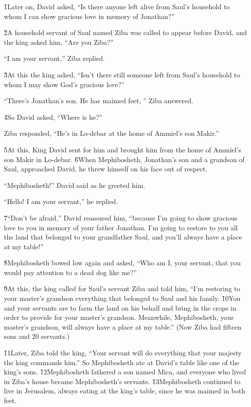 \v{1}Later on, David asked, ``Is there anyone left alive from Saul's household to whom I can show gracious love in memory of Jonathan?''

\v{2}A household servant of Saul named Ziba was called to appear before David, and the king asked him, ``Are you Ziba?''

``I am your servant,'' Ziba replied.

\v{3}At this the king asked, ``Isn't there still someone left from Saul's household to whom I may show God's gracious love?''

``There's Jonathan's son. He has maimed feet, '' Ziba answered.

\v{4}So David asked, ``Where is he?''

Ziba responded, ``He's in Lo-debar at the home of Ammiel's son Makir.''

\v{5}At this, King David sent for him and brought him from the home of Ammiel's son Makir in Lo-debar. \v{6}When Mephibosheth, Jonathan's son and a grandson of Saul, approached David, he threw himself on his face out of respect.

``Mephibosheth!'' David said as he greeted him.

``Hello! I am your servant,'' he replied.

\v{7}``Don't be afraid,'' David reassured him, ``because I'm going to show gracious love to you in memory of your father Jonathan. I'm going to restore to you all the land that belonged to your grandfather Saul, and you'll always have a place at my table!''

\v{8}Mephibosheth bowed low again and asked, ``Who am I, your servant, that you would pay attention to a dead dog like me?''

\v{9}At this, the king called for Saul's servant Ziba and told him, ``I'm restoring to your master's grandson everything that belonged to Saul and his family. \v{10}You and your servants are to farm the land on his behalf and bring in the crops in order to provide for your master's grandson. Meanwhile, Mephibosheth, your master's grandson, will always have a place at my table.'' (Now Ziba had fifteen sons and 20 servants.)

\v{11}Later, Ziba told the king, ``Your servant will do everything that your majesty the king commands him.'' So Mephibosheth ate at David's table like one of the king's sons. \v{12}Mephibosheth fathered a son named Mica, and everyone who lived in Ziba's house became Mephibosheth's servants. \v{13}Mephibosheth continued to live in Jerusalem, always eating at the king's table, since he was maimed in both feet.

